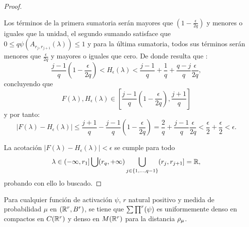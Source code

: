 \begin{proof}
\begin{itemize}
        Los términos de la primera sumatoria serán mayores que $\left(1-\frac{\epsilon}{2q} \right)$ y menores o iguales que la unidad, 
        el segundo sumando satisface que 
        $0 \leq q\psi( A_{r_j, r_{j+1}}(\lambda)) \leq 1$
        y para la última sumatoria, todos sus términos serán menores que $\frac{\epsilon}{2q}$ y mayores o iguales que cero.
        De donde resulta que : 
        \begin{equation}
            \frac{j-1}{q}\left(1-\frac{\epsilon}{2q} \right)  
            <
            H_\epsilon(\lambda) 
            <
            \frac{j-1}{q} 
            + 
            \frac{1}{q} 
            + 
            \frac{q-j}{q} \frac{\epsilon}{2q} ,
        \end{equation}
        concluyendo que 
        \begin{equation}
            F(\lambda), H_\epsilon(\lambda) 
            \in 
            \left[
                \frac{j-1}{q}\left(1-\frac{\epsilon}{2q}\right),
                \frac{j+1}{q}
            \right]
        \end{equation}
        y por tanto: 
        \begin{equation}
            | F(\lambda) - H_{\epsilon}(\lambda) | 
            \leq \frac{j+1}{q} -  \frac{j-1}{q}\left(1-\frac{\epsilon}{2q}\right)
            = 
            \frac{2}{q} + \frac{j-1}{q}\frac{\epsilon}{2q}
            < \frac{\epsilon}{2} + \frac{\epsilon}{2}
            < \epsilon.
        \end{equation}
    \end{itemize}
    La acotación $| F(\lambda) - H_{\epsilon}(\lambda) | < \epsilon$ se cumple para todo
    \begin{equation}
        \lambda \in (- \infty, r_1]
         \bigcup (r_q,+\infty) 
        \bigcup_{j \in \{1, ..., q-1\}} (r_{j},r_{j+1}] = \mathbb{R},
    \end{equation}
    probando con ello lo buscado.
\end{proof}      

\begin{teorema}\label{teorema:2_3_uniformemente_denso_compactos}
    Para cualquier función de activación $\psi$, $r$ natural positivo y
    medida de probabilidad $\mu$ en $(\mathbb{R}^r, B^r)$, 
    se tiene que $\sum \prod^r (\psi)$ es uniformemente denso en compactos
    en $C(\mathbb{R}^r)$ y denso en $M(\mathbb{R}^r)$ para la distancia $\rho_{\mu}$. 
\end{teorema}

